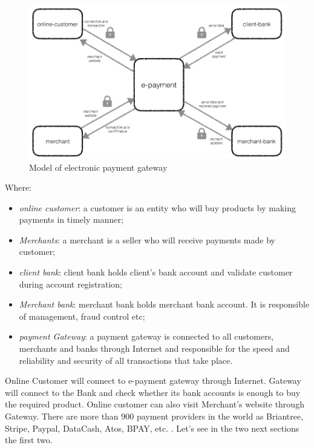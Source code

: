 \begin{figure}[htb]
\centering
\includegraphics[width=1.0\linewidth]{images/chapter2/payment_model.png}\hfill
\caption[Model of electronic payment gateway]{Model of electronic payment gateway}
\label{fig:model_payment_gateway}
\end{figure}
Where:
\begin{itemize}
\item \emph{online customer}: a customer is an entity who will buy products by
making payments in timely manner;
\item \emph{Merchants}: a merchant is a seller who will receive payments made by customer;
\item \emph{client bank}: client bank holds client’s bank account and validate customer during account registration;
\item \emph{Merchant bank}: merchant bank holds merchant bank account. It is responsible of management, fraud control etc;
\item \emph{payment Gateway}: a payment gateway is connected to all customers, merchants and banks through Internet and responsible for the speed and reliability and security of all transactions that take place.
\end{itemize}
Online Customer will connect to e-payment gateway through Internet. Gateway will connect to the Bank and check whether its bank accounts is enough to buy the required product. Online customer can also visit Merchant’s website through Gateway.
\newline
There are more than 900 payment providers in the world as Briantree, Stripe, Paypal, DataCash, Atos, BPAY, etc. \cite{payment_service_provider}.
\newline
Let's see in the two next sections the first two.